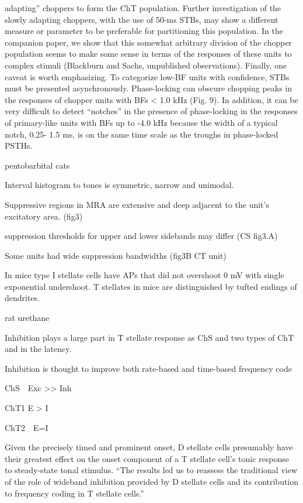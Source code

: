 \documentclass[10pt,a4paper]{article}
\begin{document}
adapting{\textquotedblright} choppers to form the ChT population.  Further
investigation of the slowly adapting choppers, with the use of 50-ms STBs, may
show a different measure or parameter to be preferable for partitioning this
population. In the companion paper, we show that this somewhat arbitrary
division of the chopper population seems to make some sense in terms of the
responses of these units to complex stimuli (Blackburn and Sachs, unpublished
observations). Finally, one caveat is worth emphasizing. To categorize low-BF
units with confidence, STBs must be presented asynchronously. Phase-locking can
obscure chopping peaks in the responses of chopper units with BFs {\textless}
1.0 kHz (Fig. 9). In addition, it can be very difficult to detect
{\textquotedblleft}notches{\textquotedblright} in the presence of phase-locking
in the responses of primary-like units with BFs up to -4.0 kHz because the width
of a typical notch, 0.25- 1.5 ms, is on the same time scale as the troughs in
phase-locked PSTHs.


\citep{RhodeGreenberg:1994b} pentobarbital cats

Interval histogram to tones is symmetric, narrow and unimodal.

Suppressive regions in MRA are extensive and deep adjacent to the
unit{\textquoteright}s excitatory area. (fig3)

suppression thresholds for upper and lower sidebands may differ (CS fig3.A)

Some units had wide suppression bandwidths (fig3B CT unit)

In mice \citep{OertelWuEtAl:1990} type I stellate cells have APs that did not
overshoot 0 mV with single exponential undershoot.  T stellates in mice are
distinguished by tufted endings of dendrites.



\citep{PaoliniClareyEtAl:2005,PaoliniClareyEtAl:2004} rat urethane

Inhibition plays a large part in T stellate response as ChS and two types of ChT
and in the latency.

Inhibition is thought to improve both rate-based and time-based frequency code

ChS\ \ Exc {\textgreater}{\textgreater} Inh

ChT1 E {\textgreater} I\ \

ChT2\ \ E=I

Given the precisely timed and prominent onset, D stellate cells presumably have
their greatest effect on the onset component of a T stellate
cell{\textquoteright}s tonic response to steady-state tonal stimulus.
{\textquotedblleft}The results led us to reassess the traditional view of the
role of wideband inhibition provided by D stellate cells and its contribution to
frequency coding in T stellate cells.{\textquotedblright}
\end{document}
